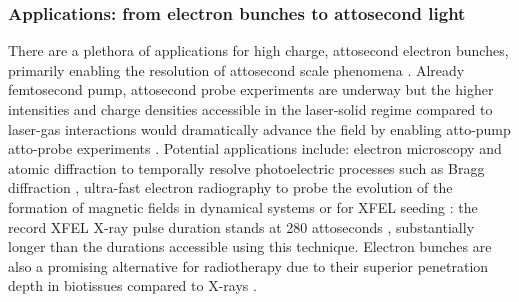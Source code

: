 \subsubsection{Applications: from electron bunches to attosecond light}
There are a plethora of applications for high charge, attosecond electron bunches, primarily enabling the resolution of attosecond scale phenomena \cite{krauszAttosecondPhysics2009}. Already femtosecond pump, attosecond probe experiments are underway \cite{calegariUltrafastElectronDynamics,takahashiNonlinearAttosecondMetrology2015} but the higher intensities and charge densities accessible in the laser-solid regime compared to laser-gas interactions \cite{edwardsXRayEmissionEffectiveness2020, linIsolatedAttosecondElectron2020} would dramatically advance the field by enabling atto-pump atto-probe experiments \cite{zhangGiantIsolatedAttosecond2020}. Potential applications include: electron microscopy and atomic diffraction to temporally resolve photoelectric processes such as Bragg diffraction \cite{morimotoDiffractionMicroscopyAttosecond2018}, ultra-fast electron radiography to probe the evolution of the formation of magnetic fields in dynamical systems \cite{schumakerUltrafastElectronRadiography2013} or for XFEL seeding \cite{cardenasSubcycleDynamicsRelativistic2019}: the record XFEL X-ray pulse duration stands at 280 attoseconds \cite{durisTunableIsolatedAttosecond2020}, substantially longer than the durations accessible using this technique. Electron bunches are also a promising alternative for radiotherapy due to their superior penetration depth in biotissues compared to X-rays \cite{glinecRadiotherapyLaserPlasma2006}.

